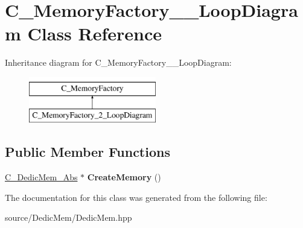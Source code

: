 \hypertarget{class_c___memory_factory__2___loop_diagram}{\section{C\-\_\-\-Memory\-Factory\-\_\-\_\-\-Loop\-Diagram Class Reference}
\label{class_c___memory_factory__2___loop_diagram}
}
Inheritance diagram for C\-\_\-\-Memory\-Factory\-\_\-\_\-\-Loop\-Diagram\-:\begin{figure}[H]
\begin{center}
\leavevmode
\includegraphics[height=2.000000cm]{class_c___memory_factory__2___loop_diagram}
\end{center}
\end{figure}
\subsection*{Public Member Functions}
\begin{DoxyCompactItemize}
\item 
\hypertarget{class_c___memory_factory__2___loop_diagram_a8e5dda3c62bd9af8ab16c4435b185d4f}{\hyperlink{class_c___dedic_mem___abs}{C\-\_\-\-Dedic\-Mem\-\_\-\-Abs} $\ast$ {\bfseries Create\-Memory} ()}\label{class_c___memory_factory__2___loop_diagram_a8e5dda3c62bd9af8ab16c4435b185d4f}

\end{DoxyCompactItemize}


The documentation for this class was generated from the following file\-:\begin{DoxyCompactItemize}
\item 
source/\-Dedic\-Mem/Dedic\-Mem.\-hpp\end{DoxyCompactItemize}
